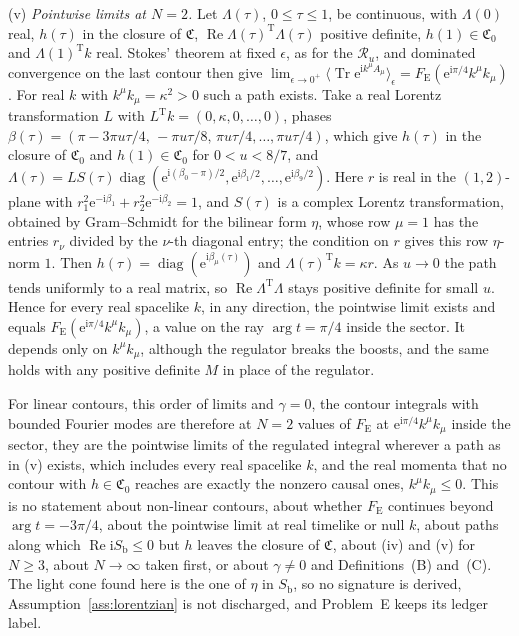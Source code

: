 (v) \emph{Pointwise limits at \(N=2\).} Let \(\Lambda(\tau)\), \(0\le\tau\le1\), be continuous, with \(\Lambda(0)\) real, \(h(\tau)\) in the closure of \(\mathfrak C\), \(\operatorname{Re}\Lambda(\tau)^{\mathrm T}\Lambda(\tau)\) positive definite, \(h(1)\in\mathfrak C_0\) and \(\Lambda(1)^{\mathrm T}k\) real. Stokes' theorem at fixed \(\epsilon\), as for the \(\mathcal R_u\), and dominated convergence on the last contour then give \(\lim_{\epsilon\to0^+}\langle\operatorname{Tr}\mathrm e^{\mathrm ik^\mu A_\mu}\rangle_\epsilon=F_{\mathrm E}(\mathrm e^{\mathrm i\pi/4}k^\mu k_\mu)\). For real \(k\) with \(k^\mu k_\mu=\kappa^2>0\) such a path exists. Take a real Lorentz transformation \(L\) with \(L^{\mathrm T}k=(0,\kappa,0,\dots,0)\), phases \(\beta(\tau)=(\pi-3\pi u\tau/4,\,-\pi u\tau/8,\,\pi u\tau/4,\dots,\pi u\tau/4)\), which give \(h(\tau)\) in the closure of \(\mathfrak C_0\) and \(h(1)\in\mathfrak C_0\) for \(0<u<8/7\), and \(\Lambda(\tau)=LS(\tau)\operatorname{diag}(\mathrm e^{\mathrm i(\beta_0-\pi)/2},\mathrm e^{\mathrm i\beta_1/2},\dots,\mathrm e^{\mathrm i\beta_9/2})\). Here \(r\) is real in the \((1,2)\)-plane with \(r_1^2\mathrm e^{-\mathrm i\beta_1}+r_2^2\mathrm e^{-\mathrm i\beta_2}=1\), and \(S(\tau)\) is a complex Lorentz transformation, obtained by Gram--Schmidt for the bilinear form \(\eta\), whose row \(\mu=1\) has the entries \(r_\nu\) divided by the \(\nu\)-th diagonal entry; the condition on \(r\) gives this row \(\eta\)-norm \(1\). Then \(h(\tau)=\operatorname{diag}(\mathrm e^{\mathrm i\beta_\mu(\tau)})\) and \(\Lambda(\tau)^{\mathrm T}k=\kappa r\). As \(u\to0\) the path tends uniformly to a real matrix, so \(\operatorname{Re}\Lambda^{\mathrm T}\Lambda\) stays positive definite for small \(u\). Hence for every real spacelike \(k\), in any direction, the pointwise limit exists and equals \(F_{\mathrm E}(\mathrm e^{\mathrm i\pi/4}k^\mu k_\mu)\), a value on the ray \(\arg t=\pi/4\) inside the sector. It depends only on \(k^\mu k_\mu\), although the regulator breaks the boosts, and the same holds with any positive definite \(M\) in place of the regulator.

For linear contours, this order of limits and \(\gamma=0\), the contour integrals with bounded Fourier modes are therefore at \(N=2\) values of \(F_{\mathrm E}\) at \(\mathrm e^{\mathrm i\pi/4}k^\mu k_\mu\) inside the sector, they are the pointwise limits of the regulated integral wherever a path as in (v) exists, which includes every real spacelike \(k\), and the real momenta that no contour with \(h\in\mathfrak C_0\) reaches are exactly the nonzero causal ones, \(k^\mu k_\mu\le0\). This is no statement about non-linear contours, about whether \(F_{\mathrm E}\) continues beyond \(\arg t=-3\pi/4\), about the pointwise limit at real timelike or null \(k\), about paths along which \(\operatorname{Re}\mathrm iS_{\mathrm b}\le0\) but \(h\) leaves the closure of \(\mathfrak C\), about (iv) and (v) for \(N\ge3\), about \(N\to\infty\) taken first, or about \(\gamma\neq0\) and Definitions~(B) and~(C). The light cone found here is the one of \(\eta\) in \(S_{\mathrm b}\), so no signature is derived, Assumption~\ref{ass:lorentzian} is not discharged, and Problem~E keeps its ledger label.
